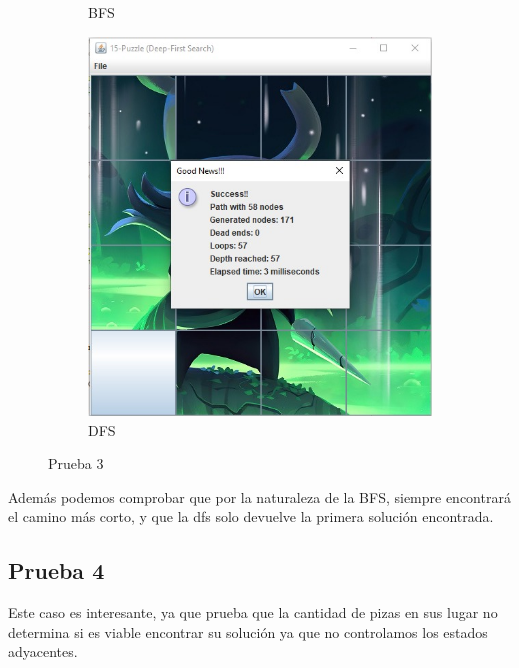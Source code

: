 \begin{figure}[!h]
\begin{subfigure}{0.3\textwidth}
            \caption{BFS}
          \end{subfigure}
          \hfill
          \begin{subfigure}{0.3\textwidth}
            \includegraphics[width=\textwidth]{Imagenes/dfs3.jpg}
            \caption{DFS}
          \end{subfigure}
          \caption{Prueba 3}
        \end{figure}

        Además podemos comprobar que por la naturaleza de la BFS, siempre encontrará el camino más corto, y que la dfs solo devuelve la primera solución encontrada.

\newpage
    
    \subsection{Prueba 4}
        Este caso es interesante, ya que prueba que la cantidad de pizas en sus lugar no determina si es viable encontrar su solución ya que no controlamos los estados adyacentes.
    
